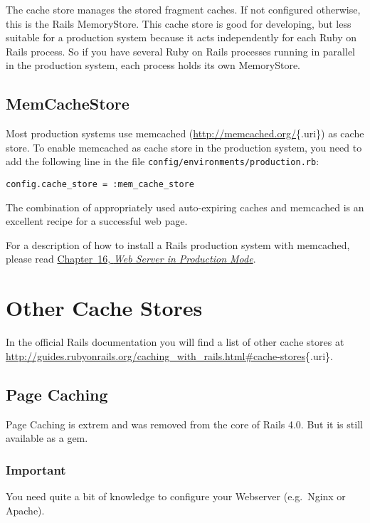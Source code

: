\documentclass[a4paper]{book}
\newcounter{tab}[chapter]
\newcommand{\chap}[1]{\newpage\thispagestyle{empty}\chapter{#1}\label{chap:\thechapter}}
\begin{document}
The cache store manages the stored fragment caches. If not configured otherwise, this is the Rails MemoryStore. This cache store is good for developing, but less suitable for a production system because it acts independently for each Ruby on Rails process. So if you have several Ruby on Rails processes running in parallel in the production system, each process holds its own MemoryStore.

\section{MemCacheStore}\label{memcachestore}

Most production systems use memcached (\url{http://memcached.org/}\{.uri\}) as cache store. To enable memcached as cache store in the production system, you need to add the following line in the file \texttt{config/environments/production.rb}:

\begin{shaded}\begin{verbatim}
config.cache_store = :mem_cache_store
\end{verbatim}\end{shaded}

The combination of appropriately used auto-expiring caches and memcached is an excellent recipe for a successful web page.

For a description of how to install a Rails production system with memcached, please read \hyperref[railsux5fproductionux5fwebserver]{Chapter~16, \emph{Web Server in Production Mode}}.

\chap{Other Cache Stores}\label{other-cache-stores}

In the official Rails documentation you will find a list of other cache stores at \url{http://guides.rubyonrails.org/caching_with_rails.html\#cache-stores}\{.uri\}.

\section{Page Caching}\label{page-caching}

Page Caching is extrem and was removed from the core of Rails 4.0. But it is still available as a gem.

\subsection{Important}\label{important-17}

You need quite a bit of knowledge to configure your Webserver (e.g.~Nginx or Apache).
\end{document}
